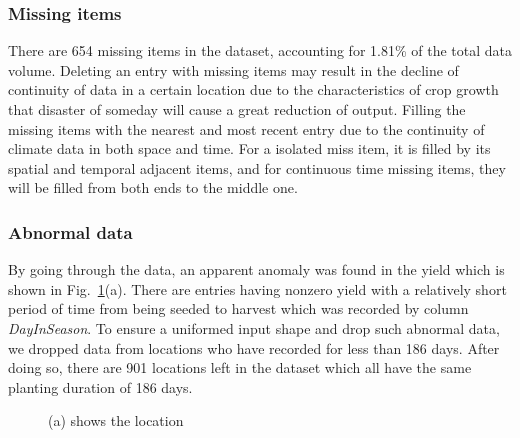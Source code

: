 \documentclass[conference, a4paper]{IEEEtran}
\begin{document}
  \subsubsection{Missing items}
    There are 654 missing items in the dataset, accounting for 1.81\% of the total data volume. Deleting an entry with missing items may result in the decline of continuity of data in a certain location due to the characteristics of crop growth that disaster of someday will cause a great reduction of output. Filling the missing items with the nearest and most recent entry due to the continuity of climate data in both space and time. For a isolated miss item, it is filled by its spatial and temporal adjacent items, and for continuous time missing items, they will be filled from both ends to the middle one.

  \subsubsection{Abnormal data}
    By going through the data, an apparent anomaly was found in the yield which is shown in Fig.~\ref{fig:drop-data}(a). There are entries having nonzero yield with a relatively short period of time from being seeded to harvest which was recorded by column \textit{DayInSeason}. To ensure a uniformed input shape and drop such abnormal data, we dropped data from locations who have recorded for less than 186 days. After doing so, there are 901 locations left in the dataset which all have the same planting duration of 186 days.

  \begin{figure} 
      \centering
      \hfill
    \caption{(a) shows the location  }
    \label{fig:drop-data}
  \end{figure}
\end{document}
